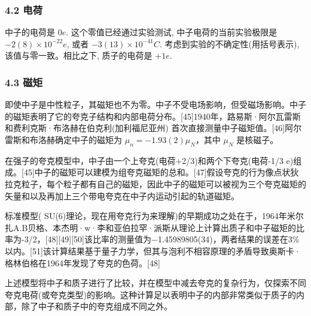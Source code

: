 \subsubsection{4.2 电荷}
中子的电荷是 $0  e$. 这个零值已经通过实验测试, 中子电荷的当前实验极限是 $-2(8) \times 10^{-22}  e$, 或者 $-3(13) \times 10^{-41}  C$. 考虑到实验的不确定性(用括号表示), 该值与零一致。相比之下, 质子的电荷是 $+1  e$.

\subsubsection{4.3 磁矩}
即使中子是中性粒子，其磁矩也不为零。中子不受电场影响，但受磁场影响。中子的磁矩表明了它的夸克子结构和内部电荷分布。[45]1940年，路易斯·阿尔瓦雷斯和费利克斯·布洛赫在伯克利(加利福尼亚州) 首次直接测量中子磁矩值。[46]阿尔雷斯和布洛赫确定中子的磁矩为 $\mu_n = -1.93(2) \mu_N$，其中 $\mu_N$ 是核磁子。

在强子的夸克模型中，中子由一个上夸克(电荷+2/3)和两个下夸克(电荷-1/3 e)组成。[45]中子的磁矩可以建模为组夸克磁矩的总和。[47]假设夸克的行为像点状狄拉克粒子，每个粒子都有自己的磁矩，因此中子的磁矩可以被视为三个夸克磁矩的矢量和以及再加上三个带电夸克在中子内运动引起的轨道磁矩。

标准模型( SU(6)理论，现在用夸克行为来理解)的早期成功之处在于，1964年米尔扎A.B贝格、本杰明·w·李和亚伯拉罕·派斯从理论上计算出质子和中子磁矩的比率为-3/2，[48][49][50]该比率的测量值为−1.45989805(34)，两者结果的误差在3\%以内。[51]该计算结果基于量子力学，但其与泡利不相容原理的矛盾导致奥斯卡·格林伯格在1964年发现了夸克的色荷。[48]

上述模型将中子和质子进行了比较，并在模型中减去夸克的复杂行为，仅探索不同夸克电荷(或夸克类型)的影响。这种计算足以表明中子的内部非常类似于质子的内部，除了中子和质子中的夸克组成不同之外。













